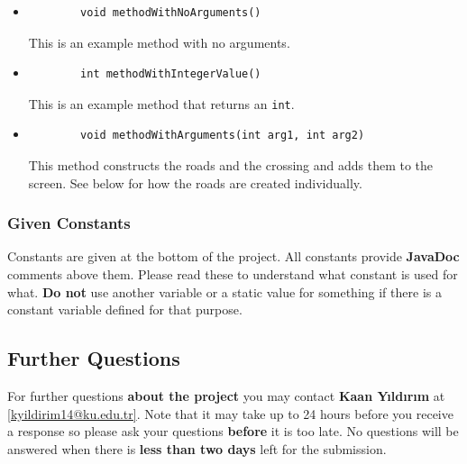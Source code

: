 \documentclass[a4paper]{article}
\makeatletter
\newcommand{\contactName}{Kaan Yıldırım}
\newcommand{\contactMail}{kyildirim14@ku.edu.tr}
\makeatother
\begin{document}
	\begin{itemize}
		
		\item
		
		\begin{lstlisting}
		void methodWithNoArguments()
		\end{lstlisting}
		This is an example method with no arguments.
		\item
		\begin{lstlisting}
		int methodWithIntegerValue()
		\end{lstlisting}
		
		This is an example method that returns an \lstinline{int}.
		\item
		\begin{lstlisting}
		void methodWithArguments(int arg1, int arg2)
		\end{lstlisting}
		This method constructs the roads and the crossing and adds them to the screen. See below for how the roads are created individually.
		
	\end{itemize}
	
	\subsubsection{Given Constants}
	Constants are given at the bottom of the project. All constants provide \textbf{JavaDoc} comments above them. Please read these to understand what constant is used for what. \textbf{Do not} use another variable or a static value for something if there is a constant variable defined for that purpose.
	
	\subsection{Further Questions}
	For further questions \textbf{about the project} you may contact \textbf{\contactName} at \href{mailto:\contactMail}{\mbox{[\contactMail]}}. Note that it may take up to 24 hours before you receive a response so please ask your questions \textbf{before} it is too late. No questions will be answered when there is \textbf{less than two days} left for the submission.
	
\end{document}
